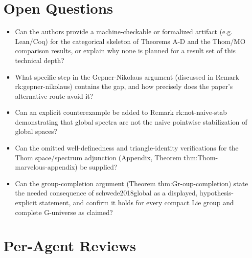 \documentclass[11pt]{article}
\begin{document}
\section*{Open Questions}
\begin{itemize}[leftmargin=*]
  \item Can the authors provide a machine-checkable or formalized artifact (e.g. Lean/Coq) for the categorical skeleton of Theorems A-D and the Thom/MO comparison results, or explain why none is planned for a result set of this technical depth?
  \item What specific step in the Gepner-Nikolaus argument (discussed in Remark rk:gepner-nikolaus) contains the gap, and how precisely does the paper's alternative route avoid it?
  \item Can an explicit counterexample be added to Remark rk:not-naive-stab demonstrating that global spectra are not the naive pointwise stabilization of global spaces?
  \item Can the omitted well-definedness and triangle-identity verifications for the Thom space/spectrum adjunction (Appendix, Theorem thm:Thom-marvelous-appendix) be supplied?
  \item Can the group-completion argument (Theorem thm:Gr-oup-completion) state the needed consequence of schwede2018global as a displayed, hypothesis-explicit statement, and confirm it holds for every compact Lie group and complete G-universe as claimed?
\end{itemize}

\section*{Per-Agent Reviews}
\end{document}
